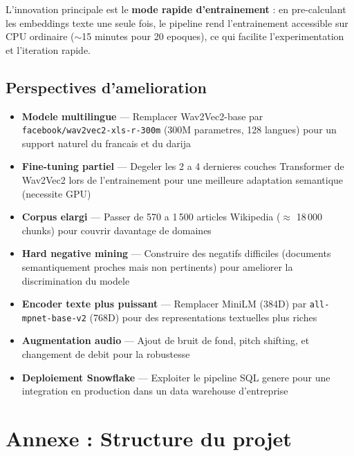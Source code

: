 \documentclass[12pt, a4paper]{article}
\begin{document}
L'innovation principale est le \textbf{mode rapide d'entrainement} : en pre-calculant
les embeddings texte une seule fois, le pipeline rend l'entrainement accessible sur
CPU ordinaire ($\sim$15 minutes pour 20 epoques), ce qui facilite l'experimentation
et l'iteration rapide.

\subsection{Perspectives d'amelioration}

\begin{itemize}[leftmargin=1.5cm]
  \item \textbf{Modele multilingue} --- Remplacer Wav2Vec2-base par
        \texttt{facebook/wav2vec2-xls-r-300m} (300M parametres, 128 langues)
        pour un support naturel du francais et du darija

  \item \textbf{Fine-tuning partiel} --- Degeler les 2 a 4 dernieres couches
        Transformer de Wav2Vec2 lors de l'entrainement pour une meilleure
        adaptation semantique (necessite GPU)

  \item \textbf{Corpus elargi} --- Passer de 570 a 1\,500 articles Wikipedia
        ($\approx$ 18\,000 chunks) pour couvrir davantage de domaines

  \item \textbf{Hard negative mining} --- Construire des negatifs difficiles
        (documents semantiquement proches mais non pertinents) pour ameliorer
        la discrimination du modele

  \item \textbf{Encoder texte plus puissant} --- Remplacer MiniLM (384D) par
        \texttt{all-mpnet-base-v2} (768D) pour des representations textuelles plus riches

  \item \textbf{Augmentation audio} --- Ajout de bruit de fond, pitch shifting,
        et changement de debit pour la robustesse

  \item \textbf{Deploiement Snowflake} --- Exploiter le pipeline SQL genere
        pour une integration en production dans un data warehouse d'entreprise
\end{itemize}

\section{Annexe : Structure du projet}
\end{document}
